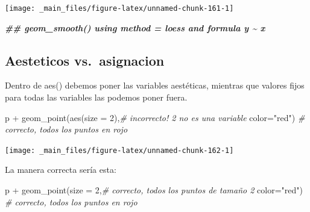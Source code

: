\documentclass[
]{book}
\newenvironment{Shaded}{\begin{snugshade}}{\end{snugshade}}
\newcommand{\AttributeTok}[1]{\textcolor[rgb]{0.77,0.63,0.00}{#1}}
\newcommand{\CommentTok}[1]{\textcolor[rgb]{0.56,0.35,0.01}{\textit{#1}}}
\newcommand{\DecValTok}[1]{\textcolor[rgb]{0.00,0.00,0.81}{#1}}
\newcommand{\DocumentationTok}[1]{\textcolor[rgb]{0.56,0.35,0.01}{\textbf{\textit{#1}}}}
\newcommand{\FunctionTok}[1]{\textcolor[rgb]{0.00,0.00,0.00}{#1}}
\newcommand{\NormalTok}[1]{#1}
\newcommand{\SpecialCharTok}[1]{\textcolor[rgb]{0.00,0.00,0.00}{#1}}
\newcommand{\StringTok}[1]{\textcolor[rgb]{0.31,0.60,0.02}{#1}}
\begin{document}
\begin{center}\texttt{[image: \_main\_files/figure-latex/unnamed-chunk-161-1]} \end{center}

\begin{Shaded}
\begin{Highlighting}[]
\DocumentationTok{\#\# \textasciigrave{}geom\_smooth()\textasciigrave{} using method = \textquotesingle{}loess\textquotesingle{} and formula \textquotesingle{}y \textasciitilde{} x\textquotesingle{}}
\end{Highlighting}
\end{Shaded}

\hypertarget{aesteticos-vs.-asignacion}{%
\subsection{Aesteticos vs.~asignacion}\label{aesteticos-vs.-asignacion}}

Dentro de aes() debemos poner las variables aestéticas, mientras que valores fijos para todas las variables las podemos poner fuera.

\begin{Shaded}
\begin{Highlighting}[]

\NormalTok{p }\SpecialCharTok{+}
  \FunctionTok{geom\_point}\NormalTok{(}\FunctionTok{aes}\NormalTok{(}\AttributeTok{size =} \DecValTok{2}\NormalTok{),}\CommentTok{\# incorrecto! 2 no es una variable}
             \AttributeTok{color=}\StringTok{"red"}\NormalTok{) }\CommentTok{\# correcto, todos los puntos en rojo}
\end{Highlighting}
\end{Shaded}

\begin{center}\texttt{[image: \_main\_files/figure-latex/unnamed-chunk-162-1]} \end{center}

La manera correcta sería esta:

\begin{Shaded}
\begin{Highlighting}[]
\NormalTok{p }\SpecialCharTok{+}
  \FunctionTok{geom\_point}\NormalTok{(}\AttributeTok{size =} \DecValTok{2}\NormalTok{,}\CommentTok{\# correcto, todos los puntos de tamaño 2}
             \AttributeTok{color=}\StringTok{"red"}\NormalTok{) }\CommentTok{\# correcto, todos los puntos en rojo}
\end{Highlighting}
\end{Shaded}
\end{document}
